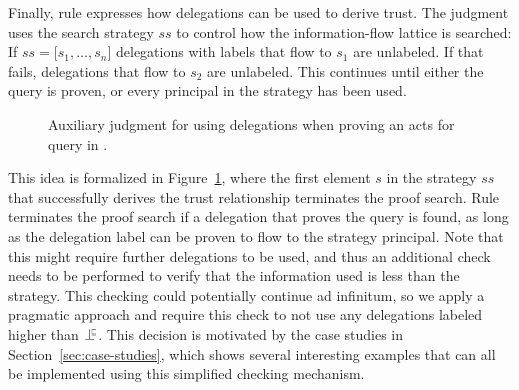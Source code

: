 Finally, rule  expresses how delegations can be used to derive trust. The judgment uses the search strategy $\mathit{ss}$ to control how the information-flow lattice is searched: If $\mathit{ss} = \lbrack s_1, \dots, s_n \rbrack$ delegations with labels that flow to $s_1$ are unlabeled. If that fails, delegations that flow to $s_2$ are unlabeled. This continues until either the query is proven, or every principal in the strategy has been used.

\begin{figure}
    \centering
    \caption{Auxiliary judgment for using delegations when proving an acts for query in \lang.}
    \label{fig:act-for-judgment-del}
\end{figure}

This idea is formalized in Figure~\ref{fig:act-for-judgment-del}, where the first element $s$ in the strategy $\mathit{ss}$ that successfully derives the trust relationship terminates the proof search. Rule  terminates the proof search if a delegation that proves the query is found, as long as the delegation label can be proven to flow to the strategy principal. Note that this might require further delegations to be used, and thus an additional check needs to be performed to verify that the information used is less than the strategy. This checking could potentially continue ad infinitum, so we apply a pragmatic approach and require this check to not use any delegations labeled higher than $\botinfoflow$. This decision is motivated by the case studies in Section~\ref{sec:case-studies}, which shows several interesting examples that can all be implemented using this simplified checking mechanism.

